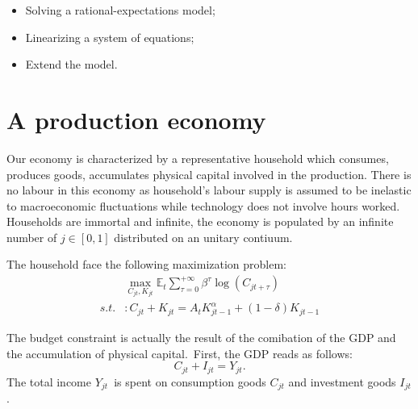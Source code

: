 \documentclass[a4paper,12pt]{article}%
\begin{document}
\FRONTPAGE%

\vspace{4ex}
\begin{myobjs}%


\begin{itemize}
\item Solving a rational-expectations model;

\item Linearizing a system of equations;

\item Extend the model.
\end{itemize}

%

\end{myobjs}%


\newpage

\section{A production economy}

Our economy is characterized by a representative household which consumes,
produces goods, accumulates physical capital involved in the production. There
is no labour in this economy as household's labour supply is assumed to be
inelastic to macroeconomic fluctuations while technology does not involve
hours worked. Households are immortal and infinite, the economy is populated
by an infinite number of $j\in\left[  0,1\right]  $ distributed on an unitary contiuum.

The household face the following maximization problem:%
\begin{align*}
&  \max_{C_{jt},K_{jt}}\mathbb{E}_{t}\sum_{\tau=0}^{+\infty}\beta^{\tau}%
\log\left(  C_{jt+\tau}\right) \\
s.t.  &  :C_{jt}+K_{jt}=A_{t}K_{jt-1}^{\alpha}+\left(  1-\delta\right)
K_{jt-1}%
\end{align*}


The budget constraint is actually the result of the comibation of the GDP and
the accumulation of physical capital.\ First, the GDP reads as follows:%
\begin{equation}
C_{jt}+I_{jt}=Y_{jt}. \label{eq hh budget constraint}%
\end{equation}
The total income $Y_{jt}$\ is spent on consumption goods $C_{jt}$ and
investment goods $I_{jt}$.
\end{document}
